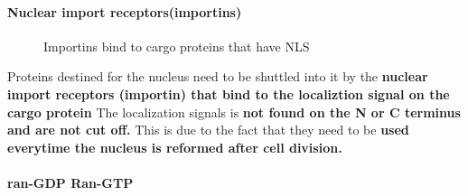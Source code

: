 \documentclass[../main.tex]{subfiles}
\begin{document}
\paragraph{Nuclear import receptors(importins)}
\begin{figure}[H]
    \centering
    \hspace{0.05\textwidth} %
    \caption{Importins bind to cargo proteins that have NLS}
    \label{fig:ITC_all}
\end{figure}





Proteins destined for the nucleus need to be shuttled into it by the \textbf{nuclear import receptors (\gls{importin}) that bind to the localiztion signal on the cargo protein} The localization signals is \textbf{not found on the N or C terminus and are not cut off.} This is due to the fact that they need to be\textbf{ used everytime the nucleus is reformed after cell division.}

\paragraph{ran-GDP Ran-GTP}
\end{document}
